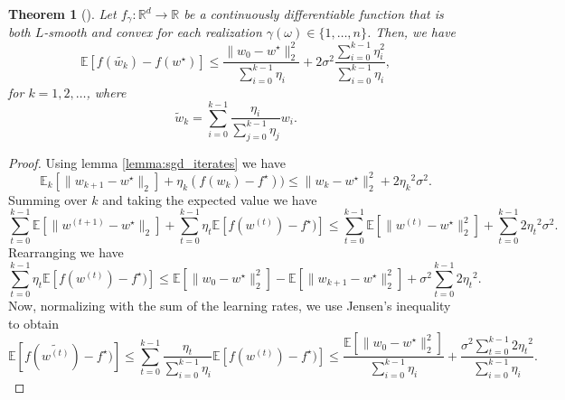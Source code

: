 \documentclass[12pt]{article}
\newtheorem{theorem}{Theorem}[section]
\theoremstyle{definition}
\numberwithin{equation}{section}
\newcommand{\R}{\mathbb{R}}
\newcommand{\E}{\mathbb{E}}
\newcommand{\ev}[1]{\mathbb{E}\left[{#1}\right]}
\newcommand{\norm}[1]{\lVert{#1}\rVert_2}
\begin{document}
\begin{theorem}[]
  \label{thm:SGD_bound}
  Let $f_{\gamma} : \R^d \rightarrow \R$ be a continuously differentiable function that is both $L$-smooth and convex for each realization $\gamma(\omega) \in \{1,\dots,n\}$. Then, we have
  \begin{equation*}
    \ev{f(\widetilde{w_{k}}) - f(w^\star)} \leq \frac{\norm{w_{0} - w^\star}^2}{\sum_{i=0}^{k-1}\eta_i} + 2 \sigma^2 \frac{\sum_{i=0}^{k-1}\eta_i^2}{\sum_{i=0}^{k-1}\eta_i},
  \end{equation*}
  for $k = 1, 2, \dots$, where 
  \begin{equation*}
    \widetilde{w}_k = \sum_{i=0}^{k-1}\frac{\eta_i}{\sum_{j=0}^{k-1}\eta_j}w_i.
  \end{equation*}
\end{theorem}
\begin{proof}
  Using lemma \autoref{lemma:sgd_iterates} we have
  \begin{equation*}
    \E_k[\norm{w_{k+1} - w^\star}] + \eta_k (f(w_{k}) - f^\star)) \leq \norm{w_{k} - w^\star}^2 + 2{\eta_k}^2\sigma^2.
  \end{equation*}
  Summing over $k$ and taking the expected value we have
  \begin{equation*}
    \sum_{t=0}^{k-1}\ev{\norm{w^{(t+1)} - w^\star}} + \sum_{t=0}^{k-1} \eta_t \ev{f(w^{(t)}) - f^\star)} \leq \sum_{t=0}^{k-1} \ev{\norm{w^{(t)} - w^\star}^2} + \sum_{t=0}^{k-1} 2{\eta_t}^2\sigma^2.
  \end{equation*}
  Rearranging we have
  \begin{equation*}
    \sum_{t=0}^{k-1} \eta_t \ev{f(w^{(t)}) - f^\star)} \leq \ev{\norm{w_{0} - w^\star}^2} - \ev{\norm{w_{k+1} - w^\star}^2} + \sigma^2\sum_{t=0}^{k-1} 2{\eta_t}^2.
  \end{equation*}
  Now, normalizing with the sum of the learning rates, we use Jensen's inequality to obtain
  \begin{equation*}
    \ev{f(\widetilde{w^{(t)}}) - f^\star)} \leq \sum_{t=0}^{k-1} \frac{\eta_t}{\sum_{i=0}^{k-1}\eta_i} \ev{f(w^{(t)}) - f^\star)} \leq \frac{\ev{\norm{w_{0} - w^\star}^2}}{\sum_{i=0}^{k-1}\eta_i} + \frac{\sigma^2\sum_{t=0}^{k-1} 2{\eta_t}^2}{\sum_{i=0}^{k-1}\eta_i}.
  \end{equation*}
\end{proof}
\end{document}
